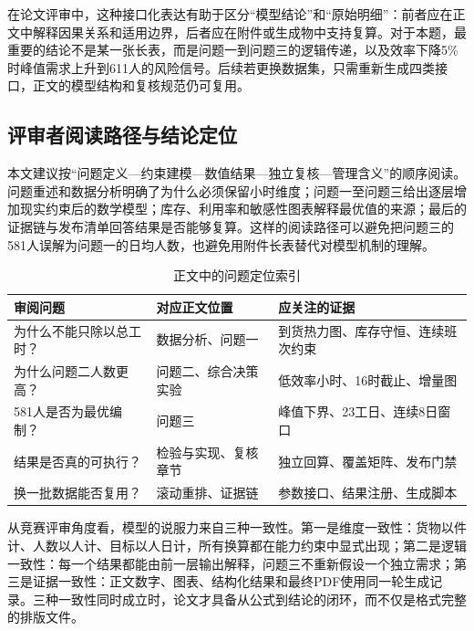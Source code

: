 在论文评审中，这种接口化表达有助于区分“模型结论”和“原始明细”：前者应在正文中解释因果关系和适用边界，后者应在附件或生成物中支持复算。对于本题，最重要的结论不是某一张长表，而是问题一到问题三的逻辑传递，以及效率下降5\%时峰值需求上升到611人的风险信号。后续若更换数据集，只需重新生成四类接口，正文的模型结构和复核规范仍可复用。

\clearpage
\subsection{评审者阅读路径与结论定位}

本文建议按“问题定义—约束建模—数值结果—独立复核—管理含义”的顺序阅读。问题重述和数据分析明确了为什么必须保留小时维度；问题一至问题三给出逐层增加现实约束后的数学模型；库存、利用率和敏感性图表解释最优值的来源；最后的证据链与发布清单回答结果是否能够复算。这样的阅读路径可以避免把问题三的581人误解为问题一的日均人数，也避免用附件长表替代对模型机制的理解。

\begin{table}[htbp]
\centering
\caption{正文中的问题定位索引}
\label{tab:reader-path}
\begin{tabular}{p{}p{}p{}}
\toprule
审阅问题 & 对应正文位置 & 应关注的证据\\
\midrule
为什么不能只除以总工时？ & 数据分析、问题一 & 到货热力图、库存守恒、连续班次约束\\
为什么问题二人数更高？ & 问题二、综合决策实验 & 低效率小时、16时截止、增量图\\
581人是否为最优编制？ & 问题三 & 峰值下界、23工日、连续8日窗口\\
结果是否真的可执行？ & 检验与实现、复核章节 & 独立回算、覆盖矩阵、发布门禁\\
换一批数据能否复用？ & 滚动重排、证据链 & 参数接口、结果注册、生成脚本\\
\bottomrule
\end{tabular}
\end{table}

从竞赛评审角度看，模型的说服力来自三种一致性。第一是维度一致性：货物以件计、人数以人计、目标以人日计，所有换算都在能力约束中显式出现；第二是逻辑一致性：每一个结果都能由前一层输出解释，问题三不重新假设一个独立需求；第三是证据一致性：正文数字、图表、结构化结果和最终PDF使用同一轮生成记录。三种一致性同时成立时，论文才具备从公式到结论的闭环，而不仅是格式完整的排版文件。
